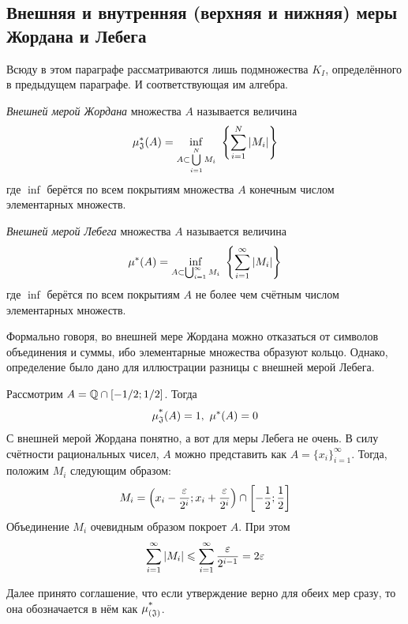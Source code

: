 \subsection{Внешняя и внутренняя (верхняя и нижняя) меры Жордана и Лебега}

\begin{note}
	Всюду в этом параграфе рассматриваются лишь подмножества $K_I$, определённого в предыдущем параграфе. И соответствующая им алгебра.
\end{note}

\begin{definition}
	\textit{Внешней мерой Жордана} множества $A$ называется величина
	\[
		\mu^*_\mathfrak{J}(A) = \inf_{A \subset \bigcup\limits_{i = 1}^N M_i} \ \left\{\sum\limits_{i = 1}^N |M_i|\right\}
	\]
	где $\inf$ берётся по всем покрытиям множества $A$ конечным числом элементарных множеств.
\end{definition}

\begin{definition}
	\textit{Внешней мерой Лебега} множества $A$ называется величина
	\[
		\mu^*(A) = \inf_{A \subset \bigcup_{i = 1}^\infty M_i} \ \left\{\sum\limits_{i = 1}^\infty |M_i|\right\}
	\]
	где $\inf$ берётся по всем покрытиям $A$ не более чем счётным числом элементарных множеств.
\end{definition}

\begin{note}
	Формально говоря, во внешней мере Жордана можно отказаться от символов объединения и суммы, ибо элементарные множества образуют кольцо. Однако, определение было дано для иллюстрации разницы с внешней мерой Лебега.
\end{note}

\begin{example}
	Рассмотрим $A = \mathbb{Q} \cap [-1/2; 1/2]$. Тогда
	\[
		\operatorname{\mu^*_\mathfrak{J}}(A) = 1,\ \mu^*(A) = 0
	\]
	С внешней мерой Жордана понятно, а вот для меры Лебега не очень. В силу счётности рациональных чисел, $A$ можно представить как $A = \{x_i\}_{i = 1}^\infty$. Тогда, положим $M_i$ следующим образом:
	\[
		M_i = \left(x_i - \frac{\varepsilon}{2^i}; x_i + \frac{\varepsilon}{2^i}\right) \cap \left[-\frac{1}{2}; \frac{1}{2}\right]
	\]
	Объединение $M_i$ очевидным образом покроет $A$. При этом
	\[
		\sum\limits_{i = 1}^\infty |M_i| \leqslant \sum\limits_{i = 1}^\infty \frac{\varepsilon}{2^{i - 1}} = 2\varepsilon
	\]
\end{example}

\begin{note}
	Далее принято соглашение, что если утверждение верно для обеих мер сразу, то она обозначается в нём как $\operatorname{\mu^*_{(\mathfrak{J})}}$.
\end{note}

